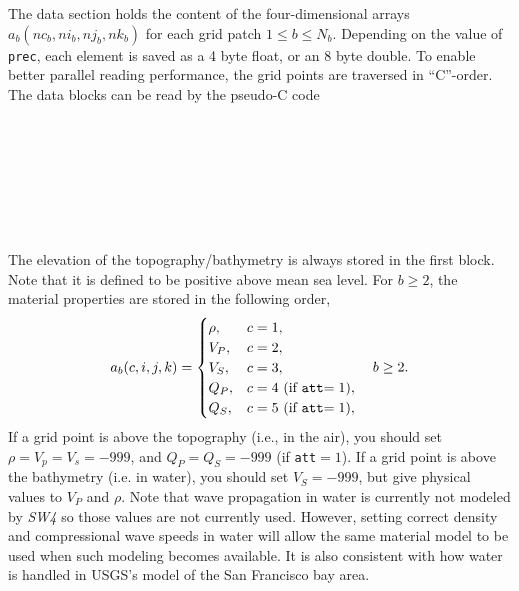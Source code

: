 \documentclass[11pt]{report}
\begin{document}
{The data section holds the content of the four-dimensional arrays $a_b(nc_b,ni_b,nj_b,nk_b)$ for
each grid patch $1\leq b\leq N_b$. Depending on the value of {\tt prec}, each element is saved as a 4 byte
float, or an 8 byte double. To enable better parallel reading performance, the grid points are
traversed in ``C''-order. The data blocks can be read by the pseudo-C code
\begin{center}
	\hspace{-35mm}{\tt for ($b=1$; $b\leq N_b$; $b$++) }\\
	\hspace{-30mm}{\tt for ($i=1$; $i\leq ni_b$; $i$++) }\\
	\hspace{-25mm}{\tt for ($j=1$; $j\leq nj_b$; $j$++) }\\
	\hspace{-20mm}{\tt for ($k=1$; $k\leq nk_b$; $k$++) }\\
	\hspace{-15mm}{\tt for ($c=1$; $c\leq nc_b$; $c$++) }\\
	\hspace{-10mm}{\tt read $a_b(c,i,j,k)$}\\
\end{center}
The elevation of the topography/bathymetry is always stored in the first block. Note that it is
defined to be positive above mean sea level. For $b\geq 2$, the material properties are stored in
the following order,
\[
	a_b(c,i,j,k) = \begin{cases}
		\rho, & c=1,                            \\
		V_P,  & c=2,                            \\
		V_S,  & c=3,                            \\
		Q_P,  & c=4 \mbox{ (if {\tt att}$=1$)}, \\
		Q_S,  & c=5 \mbox{ (if {\tt att}$=1$)}, \\
	\end{cases}\quad b\geq 2.
\]
If a grid point is above the topography (i.e., in the air), you should set $\rho=V_p=V_s=-999$, and
$Q_P=Q_S=-999$ (if {\tt att}$=1$). If a grid point is above the bathymetry (i.e. in water), you
should set $V_S=-999$, but give physical values to $V_P$ and $\rho$. Note that wave propagation in
water is currently not modeled by \emph{SW4} so those values are not currently used. However,
setting correct density and compressional wave speeds in water will allow the same material model to be
used when such modeling becomes available. It is also consistent with how water is handled in
USGS's model of the San Francisco bay area.

}
\end{document}
